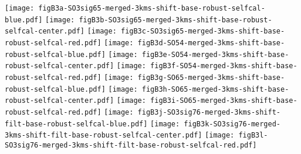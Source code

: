 \documentclass{aa}
\newcommand{\kms}{\,km\,s$^{-1}$~}
\begin{document}
\begin{appendix}
\begin{figure*}[h]
    \centering
    \texttt{[image: figB3a-SO3sig65-merged-3kms-shift-base-robust-selfcal-blue.pdf]}
    \texttt{[image: figB3b-SO3sig65-merged-3kms-shift-base-robust-selfcal-center.pdf]}
    \texttt{[image: figB3c-SO3sig65-merged-3kms-shift-base-robust-selfcal-red.pdf]}
    \texttt{[image: figB3d-SO54-merged-3kms-shift-base-robust-selfcal-blue.pdf]}
    \texttt{[image: figB3e-SO54-merged-3kms-shift-base-robust-selfcal-center.pdf]}
    \texttt{[image: figB3f-SO54-merged-3kms-shift-base-robust-selfcal-red.pdf]}
    \texttt{[image: figB3g-SO65-merged-3kms-shift-base-robust-selfcal-blue.pdf]}
    \texttt{[image: figB3h-SO65-merged-3kms-shift-base-robust-selfcal-center.pdf]}
    \texttt{[image: figB3i-SO65-merged-3kms-shift-base-robust-selfcal-red.pdf]}
    \texttt{[image: figB3j-SO3sig76-merged-3kms-shift-filt-base-robust-selfcal-blue.pdf]}
    \texttt{[image: figB3k-SO3sig76-merged-3kms-shift-filt-base-robust-selfcal-center.pdf]}
    \texttt{[image: figB3l-SO3sig76-merged-3kms-shift-filt-base-robust-selfcal-red.pdf]}
    \caption{Velocity-integrated intensity maps of the SO(6(6)-5(5))
      (upper row), SO(5(5)-4(4)) (second row), SO(6(5)-5(4)) (third row)
      and SO(7(6)-6(5)) (lower row) lines covering three velocity
      intervals. Left: blue line wing [v$_{\rm lsr,*}-10$,v$_{\rm lsr,*}-2$] \kms,
      Middle: line center [v$_{\rm lsr,*}-2$,v$_{\rm lsr,*}+2$] \kms,
      Right: red line wing [v$_{\rm lsr,*}+2$,v$_{\rm lsr,*}+10$] \kms.
      North is up and east is to the left. Note the different color scales. 
      Contours are plotted every $10 \sigma$, where (from left to right)
      $1 \sigma = 10.0, 10.4, 10.3$ mJy/beam$\cdot$\kms for SO(6(6)-5(5)),
      $1 \sigma =  7.3,  7.6,  7.4$ mJy/beam$\cdot$\kms for SO(5(5)-4(4)),
      $1 \sigma =  7.6,  8.1,  7.4$ mJy/beam$\cdot$\kms for SO(6(5)-5(4)), and 
      $1 \sigma =  8.7,  9.6,  8.7$ mJy/beam$\cdot$\kms for SO(7(6)-6(5)).
      The black ellipse in the lower left corner indicates the synthesized beam.}
    \label{SOstructfig}
\end{figure*}


\end{appendix}
\end{document}

